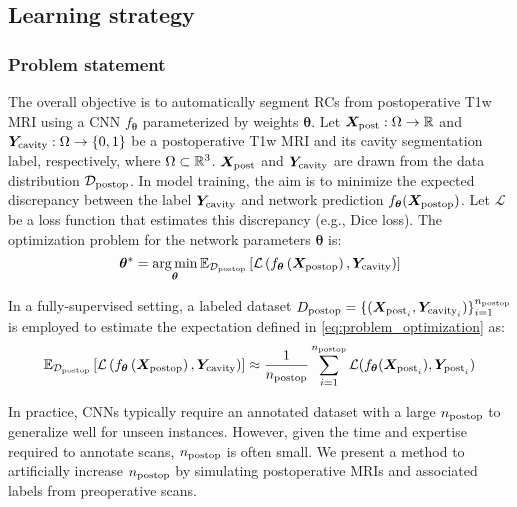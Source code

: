 \subsection{Learning strategy}
\label{sec:learning_strategy}


\subsubsection{Problem statement}

\newcommand{\loss}{\mathcal{L}}
\newcommand{\expec}{\mathbb{E}}
\newcommand{\exppost}{\expec_{\Dom\post}}

The overall objective is to automatically segment \acp{RC} from postoperative \ac{T1w} \ac{MRI} using a \ac{CNN} $f_{\bm{\theta}}$ parameterized by weights $\bm{\theta}$.
Let $\bm{X}_{\text{post}} : \Omega \to \mathbb{R}$ and $\bm{Y}_{\textnormal{cavity}}  : \Omega \to \{ 0, 1 \}$ be a postoperative \ac{T1w} \ac{MRI} and its cavity segmentation label, respectively, where $\Omega \subset \mathbb{R}^3$.
$\bm{X}_{\text{post}}$ and $\bm{Y}_{\text{cavity}}$ are drawn from the data distribution $\mathcal{D}_{\textnormal{postop}}$.
In model training, the aim is to minimize the expected discrepancy between the label $\bm{Y}_{\textnormal{cavity}}$ and network prediction $f_{\bm{\theta}}(\bm{X}_{\textnormal{postop}})$.
Let $\loss$ be a loss function that estimates this discrepancy (e.g., Dice loss).
The optimization problem for the network parameters $\bm{\theta}$ is:
\begin{equation}
    \bm{\theta}^* =
    \argmin_{\bm{\theta}}
    \exppost \left[
        \loss \left(
            f_{\bm{\theta}} \left( \X\post \right),
            \Y\cav
        \right)
    \right]
    \label{eq:problem_optimization}
\end{equation}


In a fully-supervised setting, a labeled dataset $D_{\textnormal{postop}} = \{ (\bm{X}_{\text{post}_i}, \bm{Y}_{\text{cavity}_i}) \}_{i = 1}^{n_{\textnormal{postop}}}$ is employed to estimate the expectation defined in \cref{eq:problem_optimization} as:
\begin{equation}
    \exppost \left[
        \loss \left(
            f_{\bm{\theta}} \left( \X\post \right), \Y\cav
        \right)
    \right]
    \approx \frac{1}{n\post} \sum_{i=1}^{n\post} \loss(f_{\bm{\theta}}(\X_{\text{post}_i}), \Y_{\text{post}_i})
    \label{eq:problem_optimization_fully}
\end{equation}

In practice, \acp{CNN} typically require an annotated dataset with a large $n_{\textnormal{postop}}$ to generalize well for unseen instances.
However, given the time and expertise required to annotate scans, $n_{\textnormal{postop}}$ is often small.
We present a method to artificially increase $n_{\textnormal{postop}}$ by simulating postoperative \acp{MRI} and associated labels from preoperative scans.


